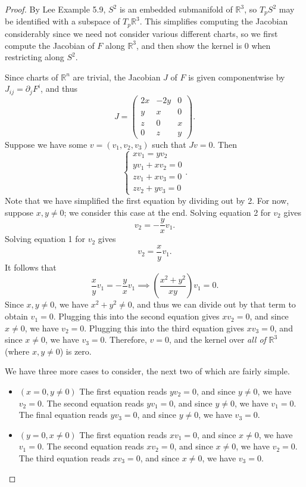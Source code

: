 \documentclass[11pt, letterpaper]{article}
\theoremstyle{plain}
\begin{document}
\begin{proof}
	By Lee Example 5.9, $S^2$ is an embedded submanifold of $\mathbb{R} ^3$, so $T_pS^2$ may be identified with a subspace of $T_p\mathbb{R} ^3$. This simplifies computing the Jacobian considerably since we need not consider various different charts, so we first compute the Jacobian of $F$ along $\mathbb{R} ^3$, and then show the kernel is 0 when restricting along $S^2$.

	Since charts of $\mathbb{R} ^n$ are trivial, the Jacobian $J$ of $F$ is given componentwise by $J_{ij} =\partial_jF^i$, and thus
	\[
		J=\begin{pmatrix}
		2x & -2y & 0 \\
		y & x & 0 \\
		z & 0 & x \\
		0 & z & y
		\end{pmatrix}
	.\]
	Suppose we have some $v=(v_1,v_2,v_3)$ such that $Jv=0$. Then
	\[
		\begin{cases}
			xv_1=yv_2\\
			yv_1+xv_2=0\\
			zv_1+xv_3=0\\
			zv_2+yv_3=0
		\end{cases}
	.\]
	Note that we have simplified the first equation by dividing out by 2. For now, suppose $x,y\neq 0$; we consider this case at the end. Solving equation 2 for $v_2$ gives
	\[
		v_2=-\frac{y}{x} v_1
	.\]
	Solving equation 1 for $v_2$ gives
	\[
		v_2=\frac{x}{y} v_1
	.\]
	It follows that
	\[
		\frac{x}{y} v_1=-\frac{y}{x} v_1\implies \left( \frac{x^2+y^2}{xy}  \right) v_1=0
	.\]
	Since $x,y\neq 0$, we have $x^2+y^2\neq 0$, and thus we can divide out by that term to obtain $v_1=0$. Plugging this into the second equation gives $xv_2=0$, and since $x\neq 0$, we have $v_2=0$. Plugging this into the third equation gives $xv_3=0$, and since $x\neq 0$, we have $v_3=0$. Therefore, $v=0$, and the kernel over \emph{all of} $\mathbb{R} ^3$ (where $x,y\neq 0$) is zero.

	We have three more cases to consider, the next two of which are fairly simple.
	\begin{itemize}
		\item $(x=0,y\neq 0)$ The first equation reads $yv_2=0$, and since $y\neq 0$, we have $v_2=0$. The second equation reads $yv_1=0$, and since $y\neq 0$, we have $v_1=0$. The final equation reads $yv_3=0$, and since $y\neq 0$, we have $v_3=0$.
		\item $(y=0,x\neq 0)$ The first equation reads $xv_1=0$, and since $x\neq 0$, we have $v_1=0$. The second equation reads $xv_2=0$, and since $x\neq 0$, we have $v_2=0$. The third equation reads $xv_3=0$, and since $x\neq 0$, we have $v_3=0$.
	\end{itemize}


\end{proof}
\end{document}
